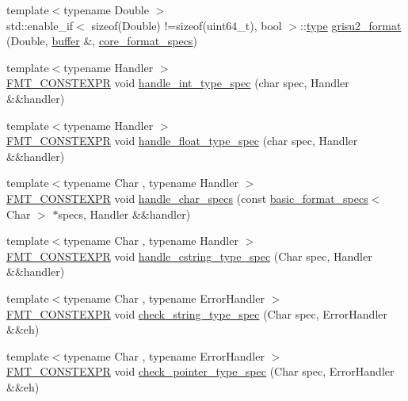 \begin{DoxyCompactItemize}
\item 
{\footnotesize template$<$typename Double $>$ }\\std\+::enable\+\_\+if$<$ sizeof(Double) !=sizeof(uint64\+\_\+t), bool $>$\+::\hyperlink{namespaceinternal_a8661864098ac0acff9a6dd7e66f59038}{type} \hyperlink{namespaceinternal_aa6ca58c625a66aa96f3839eb3bfe2f6e}{grisu2\+\_\+format} (Double, \hyperlink{namespaceinternal_a5fcdbc3efad1f390e6c3f0fdafa56122}{buffer} \&, \hyperlink{structcore__format__specs}{core\+\_\+format\+\_\+specs})
\item 
{\footnotesize template$<$typename Handler $>$ }\\\hyperlink{core_8h_a69201cb276383873487bf68b4ef8b4cd}{F\+M\+T\+\_\+\+C\+O\+N\+S\+T\+E\+X\+PR} void \hyperlink{namespaceinternal_a8a719221b08b552a41e8b24ff4fa60a0}{handle\+\_\+int\+\_\+type\+\_\+spec} (char spec, Handler \&\&handler)
\item 
{\footnotesize template$<$typename Handler $>$ }\\\hyperlink{core_8h_a69201cb276383873487bf68b4ef8b4cd}{F\+M\+T\+\_\+\+C\+O\+N\+S\+T\+E\+X\+PR} void \hyperlink{namespaceinternal_a68abded0076fd30fc64b6cd044b15b64}{handle\+\_\+float\+\_\+type\+\_\+spec} (char spec, Handler \&\&handler)
\item 
{\footnotesize template$<$typename Char , typename Handler $>$ }\\\hyperlink{core_8h_a69201cb276383873487bf68b4ef8b4cd}{F\+M\+T\+\_\+\+C\+O\+N\+S\+T\+E\+X\+PR} void \hyperlink{namespaceinternal_a0b130c25d32481413e2527484a1ec22b}{handle\+\_\+char\+\_\+specs} (const \hyperlink{structbasic__format__specs}{basic\+\_\+format\+\_\+specs}$<$ Char $>$ $\ast$specs, Handler \&\&handler)
\item 
{\footnotesize template$<$typename Char , typename Handler $>$ }\\\hyperlink{core_8h_a69201cb276383873487bf68b4ef8b4cd}{F\+M\+T\+\_\+\+C\+O\+N\+S\+T\+E\+X\+PR} void \hyperlink{namespaceinternal_aacc088a314117542f56192ea07e12693}{handle\+\_\+cstring\+\_\+type\+\_\+spec} (Char spec, Handler \&\&handler)
\item 
{\footnotesize template$<$typename Char , typename Error\+Handler $>$ }\\\hyperlink{core_8h_a69201cb276383873487bf68b4ef8b4cd}{F\+M\+T\+\_\+\+C\+O\+N\+S\+T\+E\+X\+PR} void \hyperlink{namespaceinternal_a3720624d15e22355851c82f9f2166c5a}{check\+\_\+string\+\_\+type\+\_\+spec} (Char spec, Error\+Handler \&\&eh)
\item 
{\footnotesize template$<$typename Char , typename Error\+Handler $>$ }\\\hyperlink{core_8h_a69201cb276383873487bf68b4ef8b4cd}{F\+M\+T\+\_\+\+C\+O\+N\+S\+T\+E\+X\+PR} void \hyperlink{namespaceinternal_a02f06fb6d5107704cd0d83a03c133905}{check\+\_\+pointer\+\_\+type\+\_\+spec} (Char spec, Error\+Handler \&\&eh)

\end{DoxyCompactItemize}
